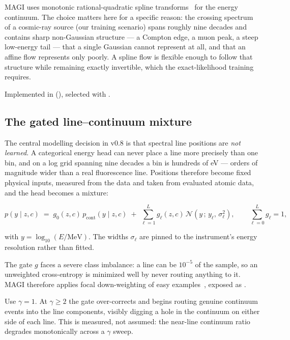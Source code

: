 \documentclass[11pt,a4paper]{article}
\begin{document}
MAGI uses monotonic rational-quadratic spline
transforms~\cite{Durkan2019NeuralSplineFlows} for the energy continuum. The
choice matters here for a specific reason: the crossing spectrum of a cosmic-ray
source (our training scenario) spans roughly nine decades and contains sharp non-Gaussian structure --- a
Compton edge, a muon peak, a steep low-energy tail --- that a single Gaussian
cannot represent at all, and that an affine flow represents only poorly. A
spline flow is flexible enough to follow that structure while remaining exactly
invertible, which the exact-likelihood training requires.

Implemented in  (), selected
with .

\subsection{The gated line--continuum mixture}

The central modelling decision in v0.8 is that spectral line positions are
\emph{not learned}. A categorical energy head can never place a line more
precisely than one bin, and on a log grid spanning nine decades a bin is
hundreds of eV --- orders of magnitude wider than a real fluorescence line.
Positions therefore become fixed physical inputs, measured from the data and
taken from evaluated atomic data, and the head becomes a mixture:

\begin{equation}
p(y \mid z, c) \;=\; g_0(z,c)\, p_{\text{cont}}(y \mid z, c)
  \;+\; \sum_{\ell=1}^{L} g_\ell(z,c)\,
        \mathcal{N}\!\left(y \,;\, y_\ell,\, \sigma_\ell^2\right),
\qquad \sum_{\ell=0}^{L} g_\ell = 1,
\end{equation}

with $y = \log_{10}(E/\text{MeV})$. The widths $\sigma_\ell$ are pinned to the
instrument's energy resolution rather than fitted.

The gate $g$ faces a severe class imbalance: a line can be $10^{-5}$ of the
sample, so an unweighted cross-entropy is minimized well by never routing
anything to it. MAGI therefore applies focal down-weighting of easy
examples~\cite{Lin2017FocalLoss}, exposed as .

\begin{maginote}
Use $\gamma = 1$. At $\gamma \geq 2$ the gate over-corrects and begins routing
genuine continuum events into the line components, visibly digging a hole in
the continuum on either side of each line. This is measured, not assumed: the
near-line continuum ratio degrades monotonically across a $\gamma$ sweep.
\end{maginote}
\end{document}
